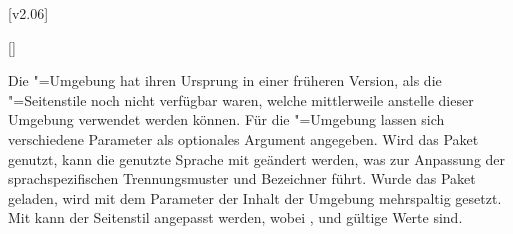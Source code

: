\begin{Declaration*}{}
\begin{Declaration*}{}
\begin{Declaration*}{}
[v2.06]

\begin{Declaration}{[]}
\begin{Declaration}{}
\begin{Declaration}{}
\begin{Declaration}[v2.02]{}
\begin{Declaration}{}{%
}
\begin{Declaration}[v2.03]{}{%
}
\begin{Declaration}[v2.03]{}{%
}
\begin{Declaration}{}{%
}
\begin{Declaration}[v2.03]{%
}{}
\begin{Declaration}[v2.02]{}{%
}
\begin{Declaration}[v2.02]{}{%
}
\begin{Declaration}[v2.02]{}{%
}
\printdeclarationlist%
%
%
%
%
Die "=Umgebung hat ihren Ursprung in einer früheren 
Version, als die "=Seitenstile noch nicht verfügbar 
waren, welche mittlerweile anstelle dieser Umgebung verwendet werden können.
Für die "=Umgebung lassen sich verschiedene Parameter als 
optionales Argument angegeben. Wird das Paket  genutzt, kann die 
genutzte Sprache mit 
geändert werden, was zur Anpassung der sprachspezifischen Trennungsmuster und 
Bezeichner führt. Wurde das Paket  geladen, wird mit dem 
Parameter  der Inhalt der 
Umgebung mehrspaltig gesetzt. Mit  kann 
der Seitenstil angepasst werden, wobei ,  und 
 gültige Werte sind. 


\end{Declaration}
\end{Declaration}
\end{Declaration}
\end{Declaration}
\end{Declaration}
\end{Declaration}
\end{Declaration}
\end{Declaration}
\end{Declaration}
\end{Declaration}
\end{Declaration}
\end{Declaration}
\end{Declaration*}
\end{Declaration*}
\end{Declaration*}
